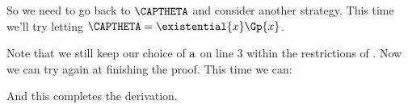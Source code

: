 So we need to go back to $\CAPTHETA$ and consider another strategy. 
This time we'll try letting $\CAPTHETA=\existential{\variable{x}}\Gp{\variable{x}}$.
\begin{gproof}[\label{GQDExampleL}]
\end{gproof}
Note that we still keep our choice of $\mathrm{a}$ on line 3 within the restrictions of . 
Now we can try again at finishing the proof. 
This time we can:
\begin{gproof}[\label{GQDExampleM}]
\end{gproof}
And this completes the derivation. 

